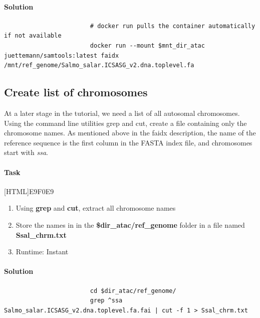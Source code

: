 \documentclass[12pt]{article}
\begin{document}
			\paragraph{Solution}
			
				\begin{minipage}{\linewidth}
					\begin{lstlisting}
						# docker run pulls the container automatically if not available
						docker run --mount $mnt_dir_atac juettemann/samtools:latest faidx /mnt/ref_genome/Salmo_salar.ICSASG_v2.dna.toplevel.fa
					\end{lstlisting}
				\end{minipage}
		
		\subsection{Create list of chromosomes}	
			At a later stage in the tutorial, we need a list of all autosomal chromosomes. 
			Using the command line utilities grep and cut, create a file containing only the chromosome names. 
			As mentioned above in the faidx description, the name of the reference sequence is the first column in the FASTA index file, and chromosomes start with \textit{ssa}.

			\paragraph{Task}
		
				[HTML]{E9F0E9}{\parbox{\linewidth}{%
						\begin{enumerate}
							\item Using \textbf{grep} and \textbf{cut}, extract all chromosome names
							\item Store the names in in the \textbf{\$dir\_atac/ref\_genome} folder in a file named \textbf{Ssal\_chrm.txt}
							\item Runtime: Instant
						\end{enumerate}
				}}
			
			\paragraph{Solution}
			
				\begin{minipage}{\linewidth}
					\begin{lstlisting}
						cd $dir_atac/ref_genome/
						grep ^ssa Salmo_salar.ICSASG_v2.dna.toplevel.fa.fai | cut -f 1 > Ssal_chrm.txt
					\end{lstlisting}
				\end{minipage}
		
\end{document}
